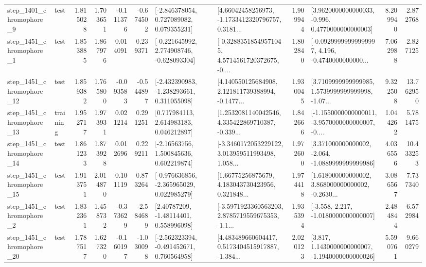 \begin{tabular}{llrrrrllrlrr}
  step\_1401\_chromophore\_9 &      test &      1.815028 &    1.703651 &     -0.111376 & -0.674502 &    [-2.846378054, 0.727089082, 0.079355231] &  [4.66042458256973, -1.1733412320796757, 0.3181... &       1.909944 &   [3.9620000000000033, -0.996, 0.4770000000000003] &            8.209940 &          2.872768 \\
  step\_1451\_chromophore\_1 &      test &      1.853885 &    1.867976 &      0.014091 &  0.239371 &   [-0.221645992, 2.774908746, -0.628093304] &  [-0.32883518549571045, 4.5714561720372675, -0.... &       1.802840 &  [-0.09299999999999997, 4.196, -0.4740000000000... &            7.062988 &          2.827125 \\
 step\_1451\_chromophore\_12 &      test &      1.859382 &    1.765800 &     -0.093583 & -0.544897 &   [-2.432390983, -1.238293661, 0.311055098] &  [4.140550125684908, 2.121811739388994, -0.1477... &       1.930045 &  [3.7109999999999985, 1.5739999999999998, -1.07... &            9.322508 &         13.762950 \\
 step\_1451\_chromophore\_13 &  training &      1.952717 &    1.973931 &      0.021214 &  0.291251 &     [0.717984113, 2.614983183, 0.046212897] &  [1.2532081140042546, 4.335422869710387, -0.339... &       1.842666 &  [-1.1550000000000011, -3.9570000000000007, -0.... &            1.044262 &          5.781475 \\
 step\_1451\_chromophore\_14 &      test &      1.861233 &    1.873928 &      0.012696 &  0.229211 &     [-2.16563756, 1.500845636, 0.602219874] &  [-3.3460172053229122, 3.013959511993498, 1.058... &       1.972600 &   [3.371000000000002, -2.064, -1.0889999999999986] &            4.036556 &         10.433253 \\
 step\_1451\_chromophore\_15 &      test &      1.913751 &    2.014870 &      0.101119 &  0.873264 &   [-0.976636856, -2.365965029, 0.022985279] &  [1.66775256875679, 4.183043730423956, 0.321848... &       1.974418 &  [1.618000000000002, 3.868000000000002, -0.2630... &            3.086567 &          7.737340 \\
  step\_1451\_chromophore\_2 &      test &      1.832361 &    1.458732 &     -0.373629 & -2.584689 &      [2.40787209, -1.48114401, 0.558996098] &  [-3.5971923360563203, 2.8785719559675353, -1.1... &       1.935394 &               [-3.558, 2.217, -1.0180000000000007] &            2.484844 &          6.572984 \\
 step\_1451\_chromophore\_20 &      test &      1.787517 &    1.627320 &     -0.160197 & -1.030098 &   [-2.562323394, -0.491452671, 0.760564958] &  [4.483489660604417, 0.5173404515917887, -1.384... &       2.020123 &   [3.817, 1.1430000000000007, -1.1940000000000026] &            5.590761 &          9.660279 \\

\end{tabular}
